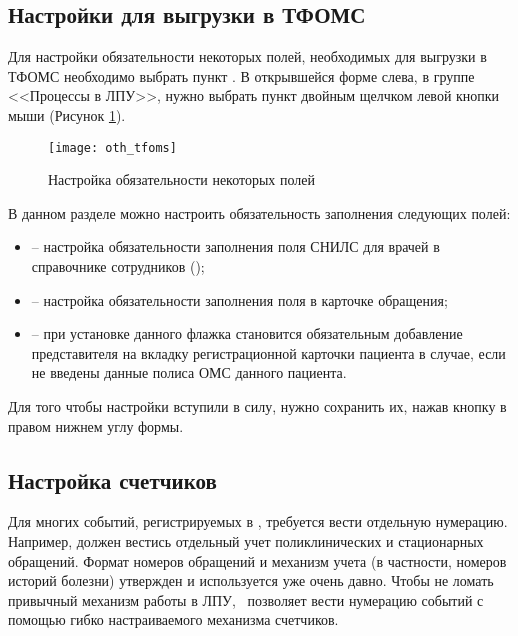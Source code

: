 \subsection{Настройки для выгрузки в ТФОМС}

Для настройки обязательности некоторых полей, необходимых для выгрузки в ТФОМС необходимо выбрать пункт . В открывшейся форме слева, в группе <<Процессы в ЛПУ>>, нужно выбрать пункт  двойным щелчком левой кнопки мыши (Рисунок \ref{img_oth_tfoms}).

\begin{figure}[ht]\centering
 \texttt{[image: oth\_tfoms]}
 \caption{Настройка обязательности некоторых полей}
 \label{img_oth_tfoms}
\end{figure}

В данном разделе можно настроить обязательность заполнения следующих полей:
\begin{itemize}
 \item {} -- настройка обязательности заполнения поля СНИЛС для врачей в справочнике сотрудников ();
 \item {} -- настройка обязательности заполнения поля   в карточке обращения;
 \item {} -- при установке данного флажка становится обязательным добавление представителя на вкладку  регистрационной карточки пациента в случае, если не введены данные полиса ОМС данного пациента.
\end{itemize}

Для того чтобы настройки вступили в силу, нужно сохранить их, нажав кнопку   в правом нижнем углу формы. 

\subsection{Настройка счетчиков}

Для многих событий, регистрируемых в \tmis, требуется вести отдельную нумерацию. Например, должен вестись отдельный учет поликлинических и стационарных обращений. Формат номеров обращений и механизм учета (в частности, номеров историй болезни) утвержден и используется уже очень давно. Чтобы не ломать привычный механизм работы в ЛПУ, \tmis~позволяет вести нумерацию событий с помощью гибко настраиваемого механизма счетчиков.

